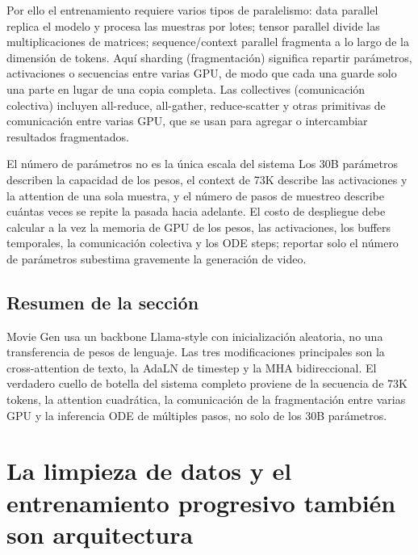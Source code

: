 \documentclass[a4paper]{article}
\begin{document}
Por ello el entrenamiento requiere varios tipos de paralelismo: data parallel replica el modelo y procesa las muestras por lotes; tensor parallel divide las multiplicaciones de matrices; sequence/context parallel fragmenta a lo largo de la dimensión de tokens. Aquí sharding (fragmentación) significa repartir parámetros, activaciones o secuencias entre varias GPU, de modo que cada una guarde solo una parte en lugar de una copia completa. Las collectives (comunicación colectiva) incluyen all-reduce, all-gather, reduce-scatter y otras primitivas de comunicación entre varias GPU, que se usan para agregar o intercambiar resultados fragmentados.

\begin{warningbox}{El número de parámetros no es la única escala del sistema}
Los 30B parámetros describen la capacidad de los pesos, el context de 73K describe las activaciones y la attention de una sola muestra, y el número de pasos de muestreo describe cuántas veces se repite la pasada hacia adelante. El costo de despliegue debe calcular a la vez la memoria de GPU de los pesos, las activaciones, los buffers temporales, la comunicación colectiva y los ODE steps; reportar solo el número de parámetros subestima gravemente la generación de video.
\end{warningbox}


\subsection{Resumen de la sección}

Movie Gen usa un backbone Llama-style con inicialización aleatoria, no una transferencia de pesos de lenguaje. Las tres modificaciones principales son la cross-attention de texto, la AdaLN de timestep y la MHA bidireccional. El verdadero cuello de botella del sistema completo proviene de la secuencia de 73K tokens, la attention cuadrática, la comunicación de la fragmentación entre varias GPU y la inferencia ODE de múltiples pasos, no solo de los 30B parámetros.
\section{La limpieza de datos y el entrenamiento progresivo también son arquitectura}
\end{document}
